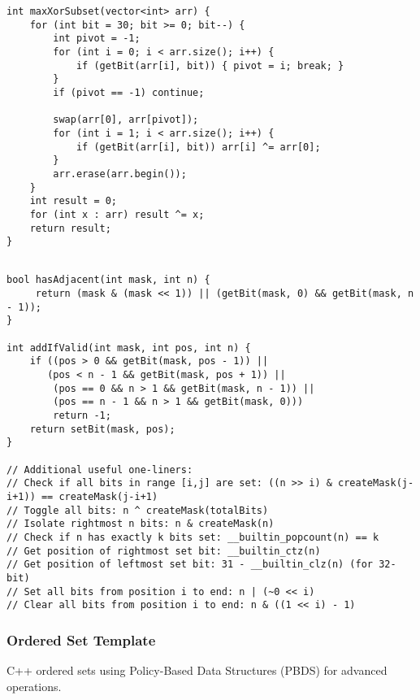 \documentclass[11pt,a4paper]{article}
\begin{document}
\newpage

\begin{lstlisting}[caption={Max XOR Subset}]
int maxXorSubset(vector<int> arr) {
    for (int bit = 30; bit >= 0; bit--) {
        int pivot = -1;
        for (int i = 0; i < arr.size(); i++) {
            if (getBit(arr[i], bit)) { pivot = i; break; }
        }
        if (pivot == -1) continue;
        
        swap(arr[0], arr[pivot]);
        for (int i = 1; i < arr.size(); i++) {
            if (getBit(arr[i], bit)) arr[i] ^= arr[0];
        }
        arr.erase(arr.begin());
    }
    int result = 0;
    for (int x : arr) result ^= x;
    return result;
}
\end{lstlisting}

\begin{lstlisting}[caption={Bitmask DP Helpers}]

bool hasAdjacent(int mask, int n) {
     return (mask & (mask << 1)) || (getBit(mask, 0) && getBit(mask, n - 1)); 
}

int addIfValid(int mask, int pos, int n) {
    if ((pos > 0 && getBit(mask, pos - 1)) ||
       (pos < n - 1 && getBit(mask, pos + 1)) ||
        (pos == 0 && n > 1 && getBit(mask, n - 1)) || 
        (pos == n - 1 && n > 1 && getBit(mask, 0)))
        return -1;
    return setBit(mask, pos);
}

// Additional useful one-liners:
// Check if all bits in range [i,j] are set: ((n >> i) & createMask(j-i+1)) == createMask(j-i+1)
// Toggle all bits: n ^ createMask(totalBits)
// Isolate rightmost n bits: n & createMask(n)
// Check if n has exactly k bits set: __builtin_popcount(n) == k
// Get position of rightmost set bit: __builtin_ctz(n)
// Get position of leftmost set bit: 31 - __builtin_clz(n) (for 32-bit)
// Set all bits from position i to end: n | (~0 << i)
// Clear all bits from position i to end: n & ((1 << i) - 1)
\end{lstlisting}

\newpage
\subsubsection{Ordered Set Template}
C++ ordered sets using Policy-Based Data Structures (PBDS) for advanced operations.
\end{document}
